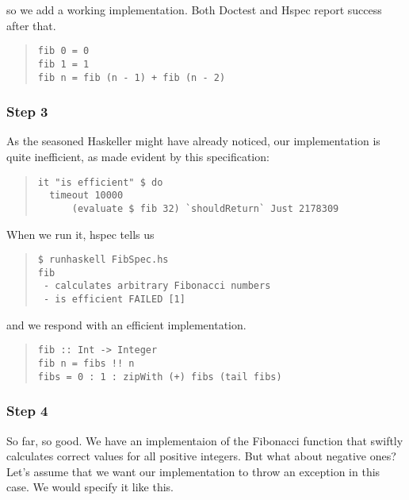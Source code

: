 \documentclass[preprint]{sigplanconf}
\begin{document}
\noindent so we add a working implementation.  Both Doctest and Hspec
report success after that.

\begin{quote}
\small
\begin{verbatim}
fib 0 = 0
fib 1 = 1
fib n = fib (n - 1) + fib (n - 2)
\end{verbatim}
\end{quote}


\subsubsection{Step 3}

As the seasoned Haskeller might have already noticed, our
implementation is quite inefficient, as made evident by this
specification:

\begin{quote}
\small
\begin{verbatim}
it "is efficient" $ do
  timeout 10000
      (evaluate $ fib 32) `shouldReturn` Just 2178309
\end{verbatim}
\end{quote}

\noindent When we run it, hspec tells us

\begin{quote}
\small
\begin{verbatim}
$ runhaskell FibSpec.hs
fib
 - calculates arbitrary Fibonacci numbers
 - is efficient FAILED [1]
\end{verbatim}
\end{quote}

\noindent and we respond with an efficient implementation.

\begin{quote}
\small
\begin{verbatim}
fib :: Int -> Integer
fib n = fibs !! n
fibs = 0 : 1 : zipWith (+) fibs (tail fibs)
\end{verbatim}
\end{quote}


\subsubsection{Step 4}

So far, so good.  We have an implementaion of the Fibonacci function
that swiftly calculates correct values for all positive integers.
But what about negative ones? Let's assume that we want our
implementation to throw an exception in this case. We would
specify it like this.
\end{document}
